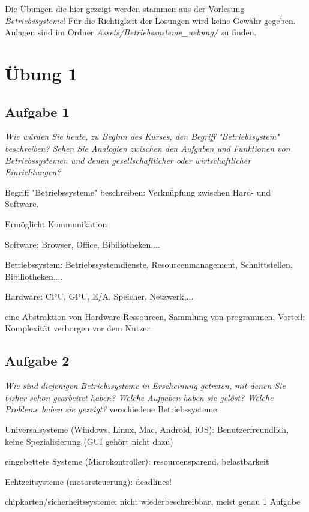 \documentclass[a4paper]{article}
\begin{document}
\begin{myboxii}[Disclaimer]
    Die Übungen die hier gezeigt werden stammen aus der Vorlesung \textit{Betriebssysteme}! Für die Richtigkeit der Lösungen wird keine Gewähr gegeben. Anlagen sind im Ordner \textit{Assets/Betriebssysteme\_uebung/} zu finden.
\end{myboxii}


\section{Übung 1}
\subsection{Aufgabe 1}
\textit{Wie würden Sie heute, zu Beginn des Kurses, den Begriff "Betriebssystem" beschreiben? Sehen Sie Analogien zwischen den Aufgaben und Funktionen von Betriebssystemen und denen gesellschaftlicher oder wirtschaftlicher Einrichtungen?}
\vspace{10mm}

Begriff "Betriebssysteme" beschreiben: Verknüpfung zwischen Hard- und Software.
\begin{itemize*}
    \item Ermöglicht Kommunikation
    \item Software: Browser, Office, Bibiliotheken,...
    \item Betriebssystem: Betriebssystemdienste, Resourcenmanagement, Schnittstellen, Bibiliotheken,...
    \item Hardware: CPU, GPU, E/A, Speicher, Netzwerk,...
\end{itemize*}
eine Abstraktion von Hardware-Ressourcen, Sammlung von programmen,
Vorteil: Komplexität verborgen vor dem Nutzer

\subsection{Aufgabe 2}
\textit{Wie sind diejenigen Betriebssysteme in Erscheinung getreten, mit denen Sie bisher schon gearbeitet haben? Welche Aufgaben haben sie gelöst? Welche Probleme haben sie gezeigt?}
\vspace{10mm}
verschiedene Betriebssysteme:
\begin{itemize*}
    \item Universalsysteme (Windows, Linux, Mac, Android, iOS): Benutzerfreundlich, keine Spezialisierung (GUI gehört nicht dazu)
    \item eingebettete Systeme (Microkontroller): resourcensparend, belastbarkeit
    \item Echtzeitsysteme (motorsteuerung): deadlines!
    \item chipkarten/sicherheitssysteme: nicht wiederbeschreibbar, meist genau 1 Aufgabe
\end{itemize*}
\end{document}
